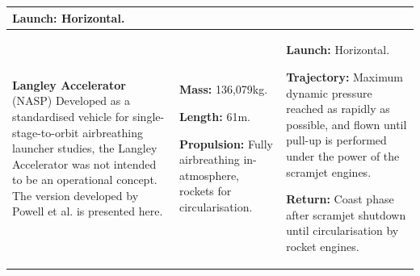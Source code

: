 {\begin{landscape}
\begin{xltabular}{\linewidth}{|X|X|X|}
			\textbf{Launch:} Horizontal.
			\\
			\hline\small \textbf{Langley Accelerator} (NASP)\cite{WCC,Powell1991,Lu1993} 
			\newline  \newline Developed as a standardised vehicle for single-stage-to-orbit airbreathing launcher studies, the Langley Accelerator was not intended to be an operational concept. The version developed by Powell et al.\cite{Powell1991} is presented here. 
			&
			\small
			
			\textbf{Mass:} 136,079kg.
			
			\textbf{Length:}  61m.
			
			\textbf{Propulsion:} Fully airbreathing in-atmosphere, rockets for circularisation.
			
			&
			\small
			
			\textbf{Launch:} Horizontal. 
			
			\textbf{Trajectory:} Maximum dynamic pressure reached as rapidly as possible, and flown until pull-up is performed under the power of the scramjet engines. 
			
			\textbf{Return:} Coast phase after scramjet shutdown until circularisation by rocket engines.
			

\end{xltabular}
\end{landscape}}
